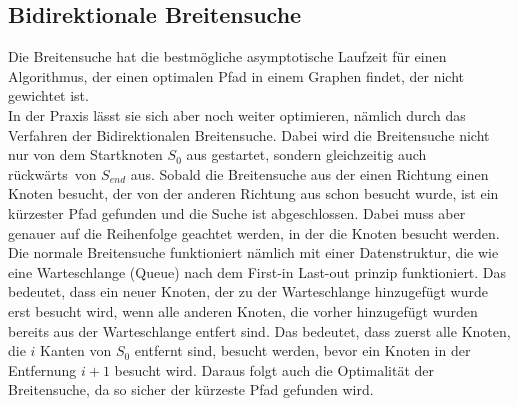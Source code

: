 \documentclass[a4paper,10pt,ngerman]{scrartcl}
\begin{document}
    \subsection{Bidirektionale Breitensuche}
    Die Breitensuche hat die bestmögliche asymptotische Laufzeit für einen Algorithmus, der einen optimalen Pfad in einem Graphen findet, der nicht gewichtet ist. \\
    In der Praxis lässt sie sich aber noch weiter optimieren, nämlich durch das Verfahren der Bidirektionalen Breitensuche.
    Dabei wird die Breitensuche nicht nur von dem Startknoten $S_0$ aus gestartet, sondern gleichzeitig auch \glqq rückwärts\grqq~von $S_{end}$ aus.
    Sobald die Breitensuche aus der einen Richtung einen Knoten besucht, der von der anderen Richtung aus schon besucht wurde, ist ein kürzester Pfad gefunden und die Suche ist abgeschlossen.
    Dabei muss aber genauer auf die Reihenfolge geachtet werden, in der die Knoten besucht werden.
    Die normale Breitensuche funktioniert nämlich mit einer Datenstruktur, die wie eine Warteschlange (Queue) nach dem First-in Last-out prinzip funktioniert. Das bedeutet, dass ein neuer Knoten, der zu der Warteschlange hinzugefügt wurde erst besucht wird, wenn alle anderen Knoten, die vorher hinzugefügt wurden bereits aus der Warteschlange entfert sind.
    Das bedeutet, dass zuerst alle Knoten, die $i$ Kanten von $S_0$ entfernt sind, besucht werden, bevor ein Knoten in der Entfernung $i+1$ besucht wird.
    Daraus folgt auch die Optimalität der Breitensuche, da so sicher der kürzeste Pfad gefunden wird. \\
\end{document}
